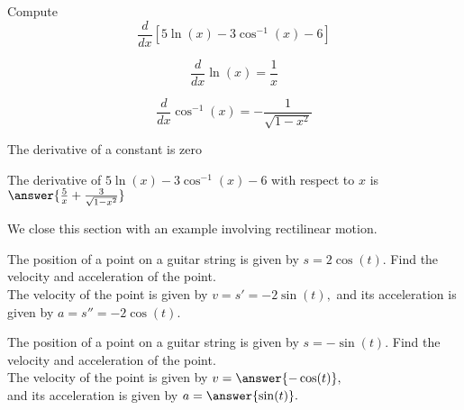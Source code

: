 \documentclass[handout]{ximera}
\begin{document}
\begin{problem} %
  Compute 
  \[
  \frac{d}{dx} \left[5\ln(x) - 3\cos^{-1}(x) - 6\right]
  \]
  
    \begin{hint}
      \[
      \frac{d}{dx} \ln(x) = \frac{1}{x}
      \]
    \end{hint}
		\begin{hint}
		  \[
      \frac{d}{dx} \cos^{-1}(x) = -\frac{1}{\sqrt{1-x^2}}
      \]
		\end{hint}
		\begin{hint}
		  The derivative of a constant is zero
		\end{hint}
		
		The derivative of $5\ln(x) - 3\cos^{-1}(x) - 6$ with respect to $x$ is
		 $\answer{\frac{5}{x} + \frac{3}{\sqrt{1-x^2}}}$
	
\end{problem}

We close this section with an example involving rectilinear motion.

\begin{example}
The position of a point on a guitar string is given by $s = 2\cos(t)$.  Find the velocity and acceleration of the point.\\
The velocity of the point is given by $v = s' = -2\sin(t),$ and its acceleration is given by $a = s'' = -2\cos(t).$
\end{example}

\begin{problem}
The position of a point on a guitar string is given by $s = -\sin(t)$.  Find the velocity and acceleration of the point.\\
The velocity of the point is given by $v = \answer{ -\cos(t)},$ \\
and its acceleration is given by $a = \answer{\sin(t)}.$
\end{problem}
\end{document}

